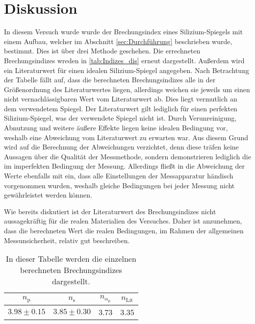 \section{Diskussion}
\label{sec:Diskussion}

In diesem Versuch wurde wurde der Brechungsindex eines Silizium-Spiegels mit einem Aufbau, welcher im Abschnitt \ref{sec:Durchführung} beschrieben wurde, bestimmt. 
Dies ist über drei Methode geschehen. Die errechneten Brechungsindizes wreden in \autoref{tab:Indizes_dis} erneut dargestellt. Außerdem wird ein Literaturwert für einen idealen
Silizium-Spiegel angegeben. Nach Betrachtung der Tabelle fällt auf, dass die berechneten Brechungsindizes alle in der Größenordnung des Literaturwertes liegen, allerdings 
weichen sie jeweils um einen nicht vernachlässigbaren Wert vom Literaturwert ab. Dies liegt vermutlich an dem verwendetem Spiegel. Der Literaturwert gilt lediglich für 
einen perfekten Silizium-Spiegel, was der verwendete Spiegel nicht ist. Durch Verunreinigung, Abnutzung und weitere äußere Effekte liegen keine idealen Bedingung vor, 
weshalb eine Abweichung vom Literaturwert zu erwarten war. Aus diesem Grund wird auf die Berechnung der Abweichungen verzichtet, denn diese träfen keine Aussagen über die
Qualität der Messmethode, sondern demonstrieren lediglich die im imperfekten Bedingung der Messung. Allerdings fließt in die Abweichung der Werte ebenfalls mit ein, dass alle
Einstellungen der Messapparatur händisch vorgenommen wurden, weshalb gleiche Bedingungen bei jeder Messung nicht gewährleistet werden können. 

Wie bereits diskutiert ist der Literaturwert des Brechungsindizes nicht aussagekräftig für die realen Materialien des Versuches. Daher ist anzunehmen, dass die berechneten 
Wert die realen Bedingungen, im Rahmen der allgemeinen Messunsicherheit, relativ gut beschreiben.

\begin{table}
    \centering
    \caption{In dieser Tabelle werden die einzelnen berechneten Brechungsindizes dargestellt.}
    \label{tab:Indizes_dis}
    \begin{tabular}{c c c c}
      \toprule
        {$n_\text{p}$} & {$n_\text{s}$} & {$n_{\alpha_\text{p}}$} & {$n_\text{Lit}$} \\
        \midrule
        $3.98 \pm 0.15$ & $3.85 \pm 0.30$ & 3.73 & 3.35 \\
      \bottomrule
    \end{tabular}
  \end{table}